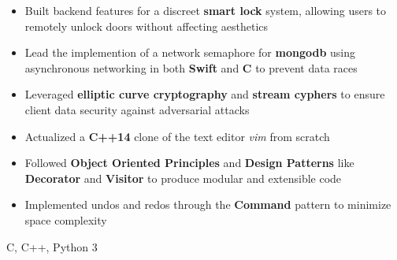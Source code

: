 \documentclass[10pt,a4paper,ragged2e]{altacv}
\begin{document}
\begin{paracol}{2}
\divider

\begin{itemize}
    \item Built backend features for a discreet \textbf{smart lock} system,
        allowing users to remotely unlock doors without affecting aesthetics
    \item Lead the implemention of a network semaphore for \textbf{mongodb} using asynchronous networking in both \textbf{Swift} and \textbf{C} to prevent data races
    \item Leveraged \textbf{elliptic curve cryptography} and \textbf{stream cyphers} to ensure client data security against adversarial attacks
\end{itemize}

\iffalse
\cvevent{Pleter}{}{May 2019}{\href{https://github.com/felix990302/word\_completion}{github.com/felix990302/word\_completion}}
\begin{itemize}
    \item Designed a concurrent autocompletion engine using a variation of \textbf{range trees} consisting of a \textbf{compressed trie} and sorted arrays in \textbf{C++}
    \item Accounted for race conditions and deadlocks using fine-grained read-write lock hierarchies
    \item Incorporated \textbf{gprof} as profiler for optimizations including a static \textbf{fixed-size allocator} to achieve \textbf{20x} speedup
\end{itemize}

\divider
\fi
{}
\begin{itemize}
    \item Actualized a \textbf{C++14} clone of the text editor \emph{vim} from scratch
    \item Followed \textbf{Object Oriented Principles} and \textbf{Design Patterns} like \textbf{Decorator} and \textbf{Visitor} to produce modular and extensible code
    \item Implemented undos and redos through the \textbf{Command} pattern to minimize space complexity
\end{itemize}

\switchcolumn

C, C++, Python 3


\end{paracol}
\end{document}
